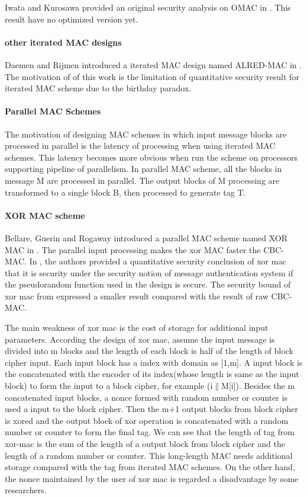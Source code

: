 \documentclass{article}
\begin{document}
Iwata and Kurosawa provided an original security analysis on OMAC in \cite{omac}. This result have no optimized version yet.
\paragraph{other iterated MAC designs}
Daemen and Rijmen introduced a iterated MAC design named ALRED-MAC in \cite{alred}. The motivation of of this work is the limitation of quantitative security result for iterated MAC scheme due to the birthday paradox. 
\paragraph{Parallel MAC Schemes}
The motivation of designing MAC schemes in which input message blocks are processed in parallel is the latency of processing when using iterated MAC schemes. This latency becomes more obvious when run the scheme on processors supporting pipeline of parallelism. 
In parallel MAC scheme, all the blocks in message M are processed in parallel. The output blocks of M processing are transformed to a single block B, then processed to generate tag T. 
\paragraph{XOR MAC scheme}
Bellare, Guerin and Rogaway introduced a parallel MAC scheme named XOR MAC in \cite{xor-mac}. 
The parallel input processing makes the xor MAC faster the CBC-MAC. 
In \cite{xor-mac}, the authors provided a quantitative security conclusion of xor mac that it is security under the security notion of message authentication system if the pseudorandom function used in the design is secure. The security bound of xor mac from \cite{xor-mac} expressed a smaller result compared with the result of raw CBC-MAC. 

The main weakness of xor mac is the cost of storage for additional input parameters. According the design of xor mac, assume the input message is divided into m blocks and the length of each block is half of the length of block cipher input. Each input block has a index with domain as [1,m]. A input block is the concatenated with the encoder of its index(whose length is same as the input block) to form the input to a block cipher, for example (i$\|$M[i]). Besides the m concatenated input blocks, a nonce formed with random number or counter is used a input to the block cipher. Then the m+1 output blocks from block cipher is xored and the output block of xor operation is concatenated with a random number or counter to form the final tag. 
We can see that the length of tag from xor-mac is the sum of the length of a output block from block cipher and the length of a random number or counter. This long-length MAC needs additional storage compared with the tag from iterated MAC schemes. 
On the other hand, the nonce maintained by the user of xor mac is regarded a disadvantage by some researchers.
\end{document}
